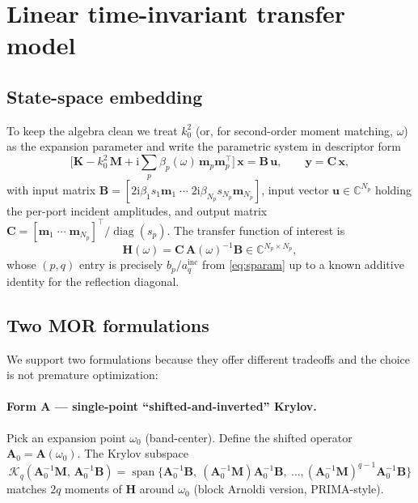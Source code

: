\documentclass[11pt,a4paper]{article}
\newcommand{\C}{\mathbb{C}}
\newcommand{\im}{\mathrm{i}}
\DeclareMathOperator{\diag}{diag}
\DeclareMathOperator{\spanop}{span}
\begin{document}
\section{Linear time-invariant transfer model}

\subsection{State-space embedding}

To keep the algebra clean we treat $k_0^2$ (or, for second-order moment
matching, $\omega$) as the expansion parameter and write the parametric
system in descriptor form
\begin{equation}
  \big[\bm K - k_0^2\,\bm M + \im\sum_p \beta_p(\omega)\,\bm m_p\bm m_p^{\!\top}\big]\,
  \bm x = \bm B\,\bm u,
  \qquad \bm y = \bm C\,\bm x,
  \label{eq:lti}
\end{equation}
with input matrix $\bm B = [2\im\beta_1 s_1 \bm m_1\;\cdots\;2\im\beta_{N_p} s_{N_p}\bm m_{N_p}]$,
input vector $\bm u\in\C^{N_p}$ holding the per-port incident amplitudes,
and output matrix $\bm C = [\bm m_1\;\cdots\;\bm m_{N_p}]^{\!\top}/\diag(s_p)$.
The transfer function of interest is
\begin{equation}
  \bm H(\omega) = \bm C\,\bm A(\omega)^{-1}\bm B \in \C^{N_p\times N_p},
\end{equation}
whose $(p,q)$ entry is precisely $b_p/a_q^{\mathrm{inc}}$ from
\eqref{eq:sparam} up to a known additive identity for the reflection
diagonal.

\subsection{Two MOR formulations}

We support two formulations because they offer different tradeoffs and
the choice is not premature optimization:

\paragraph{Form A --- single-point ``shifted-and-inverted'' Krylov.}
Pick an expansion point $\omega_0$ (band-center). Define the shifted
operator
\(
  \bm A_0 = \bm A(\omega_0).
\)
The Krylov subspace
\begin{equation}
  \mathcal{K}_q(\bm A_0^{-1}\bm M,\,\bm A_0^{-1}\bm B)
  = \spanop\!\big\{\bm A_0^{-1}\bm B,\ (\bm A_0^{-1}\bm M)\bm A_0^{-1}\bm B,\ \ldots,
                    (\bm A_0^{-1}\bm M)^{q-1}\bm A_0^{-1}\bm B\big\}
  \label{eq:krylov-singlepoint}
\end{equation}
matches $2q$ moments of $\bm H$ around $\omega_0$ (block Arnoldi version,
PRIMA-style).
\end{document}
